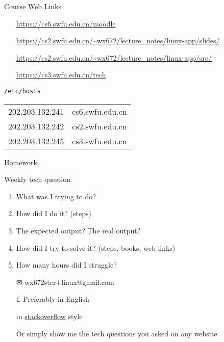 \begin{frame}{Course Web Links}
  \begin{itemize}
  \item[\moodle] \url{https://cs6.swfu.edu.cn/moodle}
  \item[\pdf] \url{https://cs2.swfu.edu.cn/~wx672/lecture_notes/linux-app/slides/}
  \item[\folder] \url{https://cs2.swfu.edu.cn/~wx672/lecture_notes/linux-app/src/}
  \item[\obook] \url{https://cs3.swfu.edu.cn/tech}
  \end{itemize}
  \begin{block}{\texttt{/etc/hosts}}
    \ttfamily
    \begin{tabular}{ll}
      202.203.132.241&cs6.swfu.edu.cn\\      
      202.203.132.242&cs2.swfu.edu.cn\\
      202.203.132.245&cs3.swfu.edu.cn\\      
    \end{tabular}
  \end{block}
\end{frame}

\begin{frame}{Homework}
  \begin{block}{Weekly tech question}
    \begin{enumerate}
    \item What was I trying to do?
    \item How did I do it? (steps)
    \item The expected output? The real output?
    \item How did I try to solve it? (steps, books, web links)
    \item How many hours did I struggle?
    \end{enumerate}
  \end{block}
  \begin{itemize}
  \item[\Large\dejavu ✉] \alert{\ttfamily wx672ster+linux@gmail.com}
  \item[$\mathbb{E}$] Preferably in English
  \item[\stackoverflow] in
    \href{https://stackoverflow.com/questions/39199299/what-is-the-essential-difference-between-compound-command-and-normal-command-inlink}{stackoverflow}
    style
  \item[Or] simply show me the tech questions you asked on any website
  \end{itemize}  
\end{frame}

